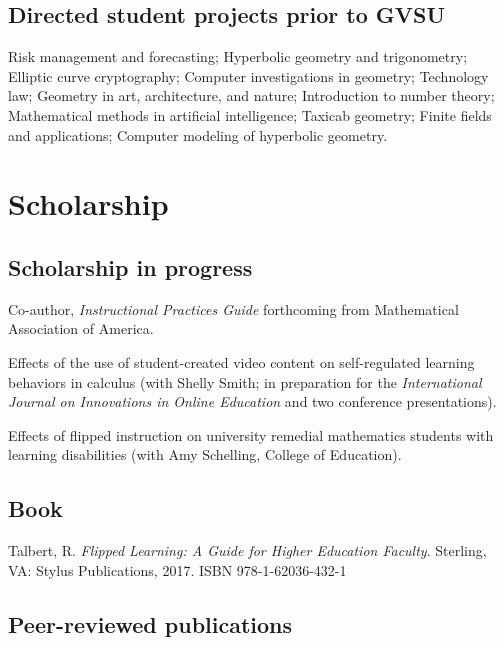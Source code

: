 \documentclass[letterpaper]{article}
\renewenvironment{itemize}{
  \begin{list}{}{
    \setlength{\leftmargin}{1.5em}
	\setlength{\itemsep}{0in}
  }
}{
  \end{list}
}
\begin{document}
\subsection*{Directed student projects prior to GVSU}

Risk management and forecasting; Hyperbolic geometry and trigonometry; Elliptic curve cryptography; Computer investigations in geometry; Technology law; Geometry in art, architecture, and nature; Introduction to number theory; Mathematical methods in artificial intelligence; Taxicab geometry; Finite fields and applications; Computer modeling of hyperbolic geometry.


\section*{Scholarship}

\subsection*{Scholarship in progress}
\begin{itemize}
	\item Co-author, \textit{Instructional Practices Guide} forthcoming from Mathematical Association of America.
	\item Effects of the use of student-created video content on self-regulated learning behaviors in calculus (with Shelly Smith; in preparation for the \textit{International Journal on Innovations in Online Education} and two conference presentations).
	\item Effects of flipped instruction on university remedial mathematics students with learning disabilities (with Amy Schelling, College of Education).
\end{itemize}


\subsection*{Book}

\begin{itemize}
  \item Talbert, R. \textit{Flipped Learning: A Guide for Higher Education Faculty}. Sterling, VA: Stylus Publications, 2017. ISBN  978-1-62036-432-1
\end{itemize}

\subsection*{Peer-reviewed publications}
\end{document}
